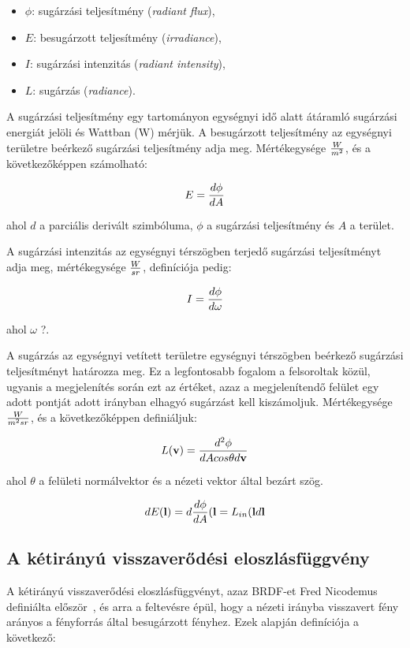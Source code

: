 \begin{itemize}[noitemsep]
\item \(\phi\): sugárzási teljesítmény (\textit{radiant flux}),
\item \(E\): besugárzott teljesítmény (\textit{irradiance}),
\item \(I\): sugárzási intenzitás (\textit{radiant intensity}),
\item \(L\): sugárzás (\textit{radiance}).
\end{itemize}

A sugárzási teljesítmény egy tartományon egységnyi idő alatt átáramló sugárzási energiát jelöli és Wattban (W) mérjük. A besugárzott teljesítmény az egységnyi területre beérkező sugárzási teljesítmény adja meg. Mértékegysége \(W \over m^2\), és a következőképpen számolható:

\[
E = { { d\phi } \over { dA } }
\]

ahol \(d\) a parciális derivált szimbóluma, \(\phi\) a sugárzási teljesítmény és \(A\) a terület.

A sugárzási intenzitás az egységnyi térszögben terjedő sugárzási teljesítményt adja meg, mértékegysége \(W \over {sr}\), definíciója pedig:

\[
I = { { d\phi } \over { d\omega } }
\]

ahol \(\omega\) ?.

A sugárzás az egységnyi vetített területre egységnyi térszögben beérkező sugárzási teljesítményt határozza meg. Ez a legfontosabb fogalom a felsoroltak közül, ugyanis a megjelenítés során ezt az értéket, azaz a megjelenítendő felület egy adott pontját adott irányban elhagyó sugárzást kell kiszámoljuk. Mértékegysége \(W \over {m^2sr}\), és a következőképpen definiáljuk:

\[
L(\mathbf{v}) = { { d^2\phi } \over { dA cos\theta d\mathbf{v} } }
\]

ahol \(\theta\) a felületi normálvektor és a nézeti vektor által bezárt szög.

\[
dE(\mathbf{l}) = d { {d\phi} \over {dA} } (\mathbf{l} = L_{in}(\mathbf{l} d\mathbf{l}
\]

\subsection{A kétirányú visszaverődési eloszlásfüggvény}

A kétirányú visszaverődési eloszlásfüggvényt, azaz BRDF-et Fred Nicodemus definiálta először~\cite{nicodemus1965directional}, és arra a feltevésre épül, hogy a nézeti irányba visszavert fény arányos a fényforrás által besugárzott fényhez. Ezek alapján definíciója a következő:

